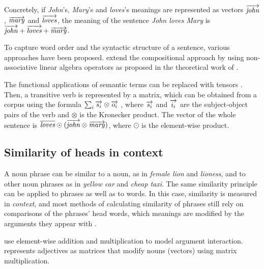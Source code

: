 Concretely, if \textit{John}'s, \textit{Mary}'s and \textit{loves}'s meanings are
represented as vectors $\overrightarrow{\mathit{john}}$, $\overrightarrow{\mathit{mary}}$ and
$\overrightarrow{\mathit{loves}}$, the meaning of the sentence \textit{John loves Mary} is
$\overrightarrow{\mathit{john}} + \overrightarrow{\mathit{loves}} + \overrightarrow{\mathit{mary}}$.

To capture word order and the syntactic structure of a sentence, various approaches have been proposed.  extend the compositional approach by using non-associative linear algebra operators as proposed in the theoretical work of .

The functional applications of semantic terms can be replaced with tensors \cite{Bourbaki1998commutative}. Then, a transitive verb is represented by a matrix, which can be obtained from a corpus using the formula $\sum_i\overrightarrow{s_i} \otimes \overrightarrow{o_i}$ \cite{Grefenstette:2011:ESC:2145432.2145580}, where $\overrightarrow{s_i}$ and $\overrightarrow{i_i}$ are the subject-object pairs of the verb and $\otimes$ is the Kronecker product. The vector of the whole sentence is $\overline{\mathit{loves}} \odot(\overrightarrow{\mathit{john}} \otimes \overrightarrow{\mathit{mary}})$, where $\odot$ is the element-wise product.
%
%

\subsection{Similarity of heads in context}
\label{sec:similarity-context}

A noun phrase can be similar to a noun, as in \textit{female lion} and \textit{lioness}, and to other noun phrases as in \textit{yellow car} and \textit{cheap taxi}. The same similarity principle can be applied to phrases as well as to words. In this case, similarity is measured in \emph{context}, and most methods of calculating similarity of phrases still rely on comparisons of the phrases' head words, which meanings are modified by the arguments they appear with \cite{Kintsch2001173}.

 use element-wise addition and multiplication to model argument interaction.  represents adjectives as matrices that modify nouns (vectors) using matrix multiplication.

